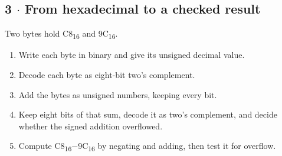 \documentclass[11pt]{article}
\begin{document}
\begin{keepsection}
\begin{keepsection}
\end{keepsection}

\begin{keepsection}
\subsection{3 \ensuremath{\cdot} From hexadecimal to a checked result}

Two bytes hold C8\textsubscript{16} and 9C\textsubscript{16}.

\begin{enumerate}
\item Write each byte in binary and give its unsigned decimal value.
\item Decode each byte as eight-bit two’s complement.
\item Add the bytes as unsigned numbers, keeping every bit.
\item Keep eight bits of that sum, decode it as two’s complement, and decide whether the signed addition overflowed.
\item Compute C8\textsubscript{16}\ensuremath{-}9C\textsubscript{16} by negating and adding, then test it for overflow.
\end{enumerate}

\end{keepsection}
\end{keepsection}
\end{document}
